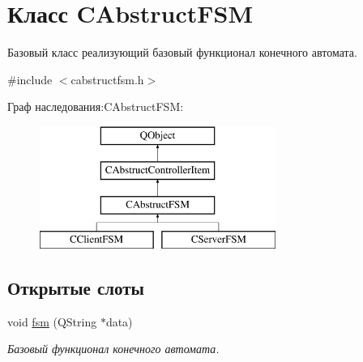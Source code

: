 \hypertarget{class_c_abstruct_f_s_m}{}\section{Класс C\+Abstruct\+F\+SM}
\label{class_c_abstruct_f_s_m}


Базовый класс реализующий базовый функционал конечного автомата.  




{\ttfamily \#include $<$cabstructfsm.\+h$>$}

Граф наследования\+:C\+Abstruct\+F\+SM\+:\begin{figure}[H]
\begin{center}
\leavevmode
\includegraphics[height=4.000000cm]{class_c_abstruct_f_s_m}
\end{center}
\end{figure}
\subsection*{Открытые слоты}
\begin{DoxyCompactItemize}
\item 
void \hyperlink{class_c_abstruct_f_s_m_ae06497e1f93385cd6c20eaa84fc253c1}{fsm} (Q\+String $\ast$data)
\begin{DoxyCompactList}\small\item\em Базовый функционал конечного автомата. \end{DoxyCompactList}\end{DoxyCompactItemize}
